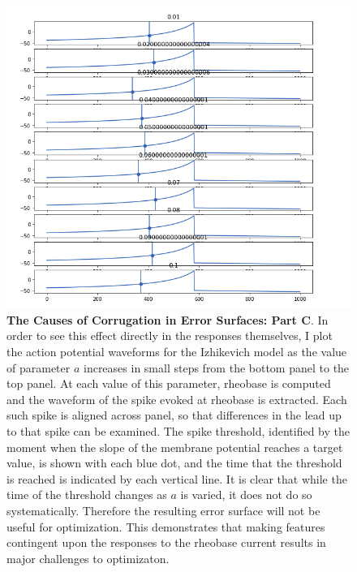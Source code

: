 \begin{figure}
\begin{center}
\includegraphics[]{figures/variable_vt.png}
\caption[Causes of Corrugation (3)]{\textbf{The Causes of Corrugation in Error Surfaces: Part C}.
In order to see this effect directly in the responses themselves, I plot the action potential waveforms for the Izhikevich model as the value of parameter $a$ increases in small steps from the bottom panel to the top panel.
At each value of this parameter, rheobase is computed and the waveform of the spike evoked at rheobase is extracted.
Each such spike is aligned across panel, so that differences in the lead up to that spike can be examined.
The spike threshold, identified by the moment when the slope of the membrane potential reaches a target value, is shown with each blue dot, and the time that the threshold is reached is indicated by each vertical line.
It is clear that while the time of the threshold changes as $a$ is varied, it does not do so systematically.
Therefore the resulting error surface will not be useful for optimization.
This demonstrates that making features contingent upon the responses to the rheobase current results in major challenges to optimizaton.}
\label{fig:variable-vt}
\end{center}
\end{figure}


